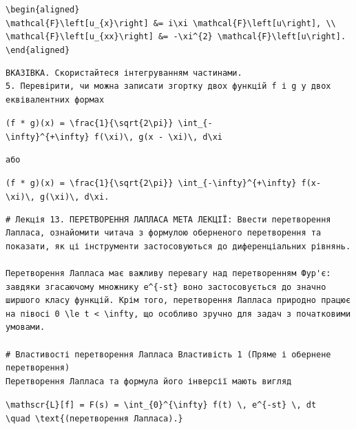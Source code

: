 \documentclass[
  ukrainian,
]{article}
\begin{document}
\texttt{\textbackslash{}begin\{aligned\}}
\texttt{\textbackslash{}mathcal\{F\}\textbackslash{}left{[}u\_\{x\}\textbackslash{}right{]}\ \&=\ i\textbackslash{}xi\ \textbackslash{}mathcal\{F\}\textbackslash{}left{[}u\textbackslash{}right{]},\ \textbackslash{}\textbackslash{}}
\texttt{\textbackslash{}mathcal\{F\}\textbackslash{}left{[}u\_\{xx\}\textbackslash{}right{]}\ \&=\ -\textbackslash{}xi\^{}\{2\}\ \textbackslash{}mathcal\{F\}\textbackslash{}left{[}u\textbackslash{}right{]}.}
\texttt{\textbackslash{}end\{aligned\}}

\begin{verbatim}
ВКАЗІВКА. Скористайтеся інтегруванням частинами.
5. Перевірити, чи можна записати згортку двох функцій f і g у двох еквівалентних формах
\end{verbatim}

\texttt{(f\ *\ g)(x)\ =\ \textbackslash{}frac\{1\}\{\textbackslash{}sqrt\{2\textbackslash{}pi\}\}\ \textbackslash{}int\_\{-\textbackslash{}infty\}\^{}\{+\textbackslash{}infty\}\ f(\textbackslash{}xi)\textbackslash{},\ g(x\ -\ \textbackslash{}xi)\textbackslash{},\ d\textbackslash{}xi}

\begin{verbatim}
або
\end{verbatim}

\texttt{(f\ *\ g)(x)\ =\ \textbackslash{}frac\{1\}\{\textbackslash{}sqrt\{2\textbackslash{}pi\}\}\ \textbackslash{}int\_\{-\textbackslash{}infty\}\^{}\{+\textbackslash{}infty\}\ f(x-\textbackslash{}xi)\textbackslash{},\ g(\textbackslash{}xi)\textbackslash{},\ d\textbackslash{}xi.}

\begin{verbatim}
# Лекція 13. ПЕРЕТВОРЕННЯ ЛАПЛАСА МЕТА ЛЕКЦІЇ: Ввести перетворення Лапласа, ознайомити читача з формулою оберненого перетворення та показати, як ці інструменти застосовуються до диференціальних рівнянь.

Перетворення Лапласа має важливу перевагу над перетворенням Фур'є: завдяки згасаючому множнику e^{-st} воно застосовується до значно ширшого класу функцій. Крім того, перетворення Лапласа природно працює на півосі 0 \le t < \infty, що особливо зручно для задач з початковими умовами.

# Властивості перетворення Лапласа Властивість 1 (Пряме і обернене перетворення)
Перетворення Лапласа та формула його інверсії мають вигляд
\end{verbatim}

\texttt{\textbackslash{}mathscr\{L\}{[}f{]}\ =\ F(s)\ =\ \textbackslash{}int\_\{0\}\^{}\{\textbackslash{}infty\}\ f(t)\ \textbackslash{},\ e\^{}\{-st\}\ \textbackslash{},\ dt}
\texttt{\textbackslash{}quad\ \textbackslash{}text\{(перетворення\ Лапласа).\}}
\end{document}
